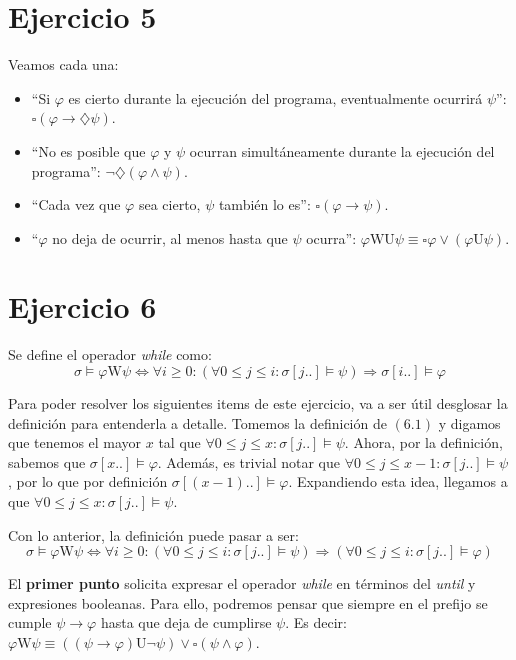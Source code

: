 \documentclass{article}
\begin{document}
\section*{Ejercicio 5}
Veamos cada una:
\begin{itemize}
	\item ``Si $\varphi$ es cierto durante la ejecución del programa, eventualmente ocurrirá $\psi$'': $\square(\varphi \to \diamondsuit\psi)$.
	\item ``No es posible que $\varphi$ y $\psi$ ocurran simultáneamente durante la ejecución del programa'': $\neg\diamondsuit(\varphi \land \psi)$.
	\item ``Cada vez que $\varphi$ sea cierto, $\psi$ también lo es'': $\square(\varphi \to \psi)$.
	\item ``$\varphi$ no deja de ocurrir, al menos hasta que $\psi$ ocurra'': $\varphi \text{WU} \psi \equiv \square\varphi \lor (\varphi \text{U} \psi)$.
\end{itemize}

\section*{Ejercicio 6}
Se define el operador \textit{while} como:
\begin{equation*}
	\tag*{(6.1)}
	\sigma \vDash \varphi \text{W} \psi \iff \forall i \geq 0 : (\forall 0 \leq j \leq i : \sigma[j..] \vDash \psi) \Rightarrow \sigma[i..] \vDash \varphi
\end{equation*}

Para poder resolver los siguientes items de este ejercicio, va a ser útil desglosar la definición para entenderla a detalle.
Tomemos la definición de $(6.1)$ y digamos que tenemos el mayor $x$ tal que $\forall 0 \leq j \leq x : \sigma[j..] \vDash \psi$.
Ahora, por la definición, sabemos que $\sigma[x..] \vDash \varphi$.
Además, es trivial notar que $\forall 0 \leq j \leq x-1 : \sigma[j..] \vDash \psi$, por lo que por definición $\sigma[(x-1)..] \vDash \varphi$.
Expandiendo esta idea, llegamos a que $\forall 0 \leq j \leq x : \sigma[j..] \vDash \psi$.

Con lo anterior, la definición puede pasar a ser:
\begin{equation*}
	\tag*{(6.2)}
	\sigma \vDash \varphi \text{W} \psi \iff \forall i \geq 0 : (\forall 0 \leq j \leq i : \sigma[j..] \vDash \psi) \Rightarrow (\forall 0 \leq j \leq i : \sigma[j..] \vDash \varphi)
\end{equation*}

El \textbf{primer punto} solicita expresar el operador \textit{while} en términos del \textit{until} y expresiones booleanas.
Para ello, podremos pensar que siempre en el prefijo se cumple $\psi \to \varphi$ hasta que deja de cumplirse $\psi$.
Es decir: $\varphi \text{W} \psi \equiv ((\psi \to \varphi) \text{U} \neg\psi) \lor \square(\psi \land \varphi)$.
\end{document}
